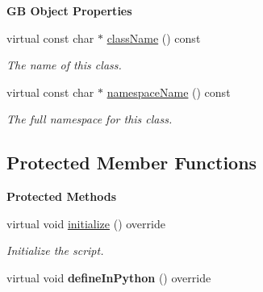 \begin{Indent}\textbf{ GB Object Properties}\par
\begin{DoxyCompactItemize}
\item 
virtual const char $\ast$ \mbox{\hyperlink{classrev_1_1_python_class_script_adbdcf0106db89f58196a253e5d3b6831}{class\+Name}} () const
\begin{DoxyCompactList}\small\item\em The name of this class. \end{DoxyCompactList}\item 
virtual const char $\ast$ \mbox{\hyperlink{classrev_1_1_python_class_script_a3e596d1eec111c02d431496f6a750701}{namespace\+Name}} () const
\begin{DoxyCompactList}\small\item\em The full namespace for this class. \end{DoxyCompactList}\end{DoxyCompactItemize}
\end{Indent}
\subsection*{Protected Member Functions}
\begin{Indent}\textbf{ Protected Methods}\par
\begin{DoxyCompactItemize}
\item 
\mbox{\label{classrev_1_1_python_class_script_a8fcd87df6ebf01202d18954ae96faac1}} 
virtual void \mbox{\hyperlink{classrev_1_1_python_class_script_a8fcd87df6ebf01202d18954ae96faac1}{initialize}} () override
\begin{DoxyCompactList}\small\item\em Initialize the script. \end{DoxyCompactList}\item 
\mbox{\label{classrev_1_1_python_class_script_a2eabd8de856717dc7b11d69367412ef5}} 
virtual void {\bfseries define\+In\+Python} () override
\end{DoxyCompactItemize}
\end{Indent}
